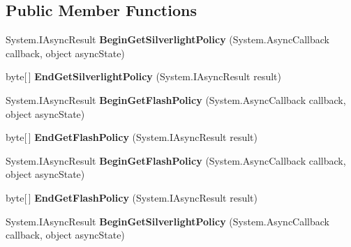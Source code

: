 \subsection*{Public Member Functions}
\begin{DoxyCompactItemize}
\item 
\hypertarget{interface_i_cross_domain_policy_responder_a048aabac3023d314d0e2b1bb1340cdb8}{
System.IAsyncResult {\bfseries BeginGetSilverlightPolicy} (System.AsyncCallback callback, object asyncState)}
\label{interface_i_cross_domain_policy_responder_a048aabac3023d314d0e2b1bb1340cdb8}

\item 
\hypertarget{interface_i_cross_domain_policy_responder_addab78f9533b2b39f5c719b8151fbac8}{
byte\mbox{[}$\,$\mbox{]} {\bfseries EndGetSilverlightPolicy} (System.IAsyncResult result)}
\label{interface_i_cross_domain_policy_responder_addab78f9533b2b39f5c719b8151fbac8}

\item 
\hypertarget{interface_i_cross_domain_policy_responder_abab519110ad26fe6221efc166e30e5c3}{
System.IAsyncResult {\bfseries BeginGetFlashPolicy} (System.AsyncCallback callback, object asyncState)}
\label{interface_i_cross_domain_policy_responder_abab519110ad26fe6221efc166e30e5c3}

\item 
\hypertarget{interface_i_cross_domain_policy_responder_a0b37154e9f138d5a6e9026139895d871}{
byte\mbox{[}$\,$\mbox{]} {\bfseries EndGetFlashPolicy} (System.IAsyncResult result)}
\label{interface_i_cross_domain_policy_responder_a0b37154e9f138d5a6e9026139895d871}

\item 
\hypertarget{interface_i_cross_domain_policy_responder_abab519110ad26fe6221efc166e30e5c3}{
System.IAsyncResult {\bfseries BeginGetFlashPolicy} (System.AsyncCallback callback, object asyncState)}
\label{interface_i_cross_domain_policy_responder_abab519110ad26fe6221efc166e30e5c3}

\item 
\hypertarget{interface_i_cross_domain_policy_responder_a0b37154e9f138d5a6e9026139895d871}{
byte\mbox{[}$\,$\mbox{]} {\bfseries EndGetFlashPolicy} (System.IAsyncResult result)}
\label{interface_i_cross_domain_policy_responder_a0b37154e9f138d5a6e9026139895d871}

\item 
\hypertarget{interface_i_cross_domain_policy_responder_a048aabac3023d314d0e2b1bb1340cdb8}{
System.IAsyncResult {\bfseries BeginGetSilverlightPolicy} (System.AsyncCallback callback, object asyncState)}
\label{interface_i_cross_domain_policy_responder_a048aabac3023d314d0e2b1bb1340cdb8}


\end{DoxyCompactItemize}
